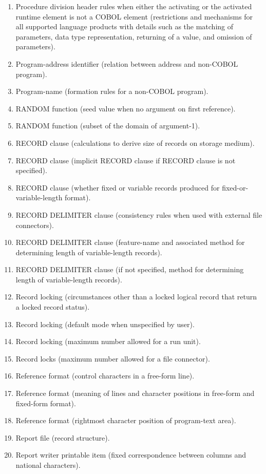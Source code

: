 \begin{enumerate}
\item Procedure division header rules when either the activating or the activated runtime element is not a COBOL element (restrictions and mechanisms for all supported language products with details such as the matching of parameters, data type representation, returning of a value, and omission of parameters).
\item Program-address identifier (relation between address and non-COBOL program).
\item Program-name (formation rules for a non-COBOL program).
\item RANDOM function (seed value when no argument on first reference).
\item RANDOM function (subset of the domain of argument-1).
\item RECORD clause (calculations to derive size of records on storage medium).
\item RECORD clause (implicit RECORD clause if RECORD clause is not specified).
\item RECORD clause (whether fixed or variable records produced for fixed-or-variable-length format).
\item RECORD DELIMITER clause (consistency rules when used with external file connectors).
\item RECORD DELIMITER clause (feature-name and associated method for determining length of variable-length
  records).
\item RECORD DELIMITER clause (if not specified, method for determining length of variable-length records).
\item Record locking (circumstances other than a locked logical record that return a locked record status).
\item Record locking (default mode when unspecified by user).
\item Record locking (maximum number allowed for a run unit).
\item Record locks (maximum number allowed for a file connector).
\item Reference format (control characters in a free-form line).
\item Reference format (meaning of lines and character positions in free-form and fixed-form format).
\item Reference format (rightmost character position of program-text area).
\item Report file (record structure).
\item Report writer printable item (fixed correspondence between columns and national characters).

\end{enumerate}
